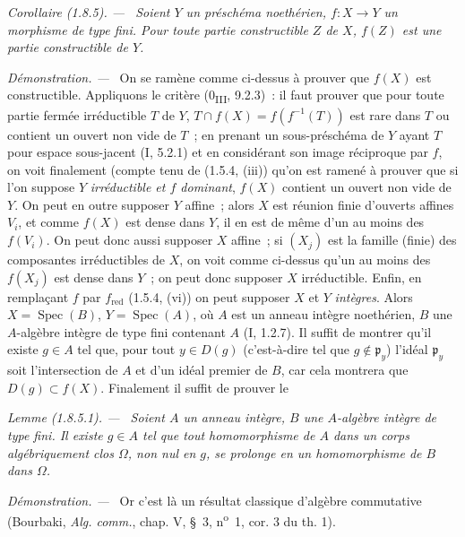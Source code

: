 \documentclass[10pt,oneside]{book}
\makeatletter
\newcommand{\setmanualcurrentlabel}[1]{\def\@currentlabel{#1}}
\newcommand{\oldpage}[2][]{%
  \setcounter{footnote}{0}%
  \marginpar{\scriptsize\textbf{#1}~|~#2}\ignorespaces}
\newenvironment{corollary}[1][]{%
  \setmanualcurrentlabel{#1}\par\medskip\noindent\itshape Corollaire (#1). ---\ }{\par}
\newenvironment{lemma}[1][]{%
  \setmanualcurrentlabel{#1}\par\medskip\noindent\itshape Lemme (#1). ---\ }{\par}
\newenvironment{proof}{%
  \par\medskip\noindent\textit{Démonstration. ---\ }}{\par}
\makeatother
\begin{document}
\begin{corollary}[1.8.5]
\label{IV.1.8.5-fr}
Soient $Y$ un préschéma noethérien, $f:X\to Y$ un morphisme de type fini.
Pour toute partie constructible $Z$ de $X$, $f(Z)$ est une partie
constructible de $Y$.
\end{corollary}

\oldpage[IV-1]{240}

\begin{proof}
On se ramène comme ci-dessus à prouver que $f(X)$ est constructible.
Appliquons le critère (0\textsubscript{III}, 9.2.3)~: il faut prouver que pour
toute partie fermée irréductible $T$ de $Y$, $T\cap f(X)=f(f^{-1}(T))$ est
rare dans $T$ ou contient un ouvert non vide de $T$~; en prenant un
sous-préschéma de $Y$ ayant $T$ pour espace sous-jacent (I, 5.2.1) et en
considérant son image réciproque par $f$, on voit finalement (compte tenu de
(1.5.4, (iii)) qu'on est ramené à prouver que si l'on suppose $Y$
\emph{irréductible et $f$ dominant}, $f(X)$ contient un ouvert non vide de
$Y$. On peut en outre supposer $Y$ affine~; alors $X$ est réunion finie
d'ouverts affines $V_i$, et comme $f(X)$ est dense dans $Y$, il en est de
même d'un au moins des $f(V_i)$. On peut donc aussi supposer $X$ affine~; si
$(X_j)$ est la famille (finie) des composantes irréductibles de $X$, on voit
comme ci-dessus qu'un au moins des $f(X_j)$ est dense dans $Y$~; on peut donc
supposer $X$ irréductible. Enfin, en remplaçant $f$ par $f_{\mathrm{red}}$
(1.5.4, (vi)) on peut supposer $X$ et $Y$ \emph{intègres}. Alors
$X=\operatorname{Spec}(B)$, $Y=\operatorname{Spec}(A)$, où $A$ est un
anneau intègre noethérien, $B$ une $A$-algèbre intègre de type fini contenant
$A$ (I, 1.2.7). Il suffit de montrer qu'il existe $g\in A$ tel que, pour tout
$y\in D(g)$ (c'est-à-dire tel que $g\notin\mathfrak p_y$) l'idéal
$\mathfrak p_y$ soit l'intersection de $A$ et d'un idéal premier de $B$, car
cela montrera que $D(g)\subset f(X)$. Finalement il suffit de prouver le
\end{proof}

\begin{lemma}[1.8.5.1]
\label{IV.1.8.5.1-fr}
Soient $A$ un anneau intègre, $B$ une $A$-algèbre intègre de type fini. Il
existe $g\in A$ tel que tout homomorphisme de $A$ dans un corps
algébriquement clos $\Omega$, non nul en $g$, se prolonge en un homomorphisme
de $B$ dans $\Omega$.
\end{lemma}

\begin{proof}
Or c'est là un résultat classique d'algèbre commutative (Bourbaki,
\emph{Alg. comm.}, chap. V, \S~3, n\textsuperscript{o}~1, cor. 3 du th. 1).
\end{proof}
\end{document}
